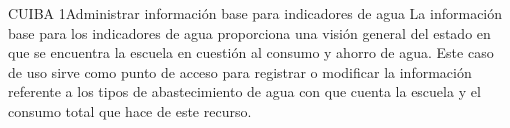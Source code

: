 
\begin{UseCase}{CUIBA 1}{Administrar información base para indicadores de agua}
    {
	La información base para los indicadores de agua proporciona una visión general del estado en que se encuentra la escuela en cuestión al consumo y ahorro de agua. Este caso de uso sirve como punto de acceso para registrar o modificar la información referente a los tipos de abastecimiento de agua con que cuenta la escuela y el consumo total que hace de este recurso.
    }
    
    

\end{UseCase}
